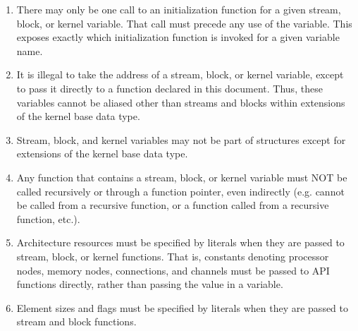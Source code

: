 \begin{enumerate}

\item There may only be one call to an initialization function for a given stream, block, or kernel variable. That call must precede any use of the variable. This exposes exactly which initialization function is invoked for a given variable name.

\item It is illegal to take the address of a stream, block,
or kernel variable, except to pass it directly to a function declared in this document. Thus, these variables cannot be aliased other than streams and blocks within extensions of the kernel base data type.

\item Stream, block, and kernel variables may not be part
of structures except for extensions of the kernel base data type.

\item Any function that contains a stream, block, or kernel variable 
must NOT be called recursively or through a function pointer, even indirectly (e.g. cannot be called from a recursive function, 
or a function called from a recursive function, etc.).

\item Architecture resources must be specified by literals when they are passed to stream, block, or kernel functions.  That is, constants denoting processor nodes, memory nodes, connections, and channels must be passed to API functions directly, rather than passing the value in a variable.

\item Element sizes and flags must be specified by literals when they are passed to stream and block functions.

\end{enumerate}
